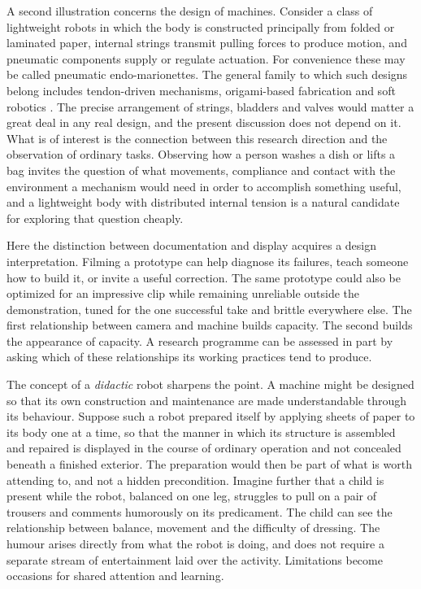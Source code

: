 \documentclass[11pt]{article}
\theoremstyle{definition}
\theoremstyle{remark}
\begin{document}
A second illustration concerns the design of machines. Consider a class of lightweight robots in which the body is constructed principally from folded or laminated paper, internal strings transmit pulling forces to produce motion, and pneumatic components supply or regulate actuation. For convenience these may be called pneumatic endo-marionettes. The general family to which such designs belong includes tendon-driven mechanisms, origami-based fabrication and soft robotics \cite{felton2014,rus2015}. The precise arrangement of strings, bladders and valves would matter a great deal in any real design, and the present discussion does not depend on it. What is of interest is the connection between this research direction and the observation of ordinary tasks. Observing how a person washes a dish or lifts a bag invites the question of what movements, compliance and contact with the environment a mechanism would need in order to accomplish something useful, and a lightweight body with distributed internal tension is a natural candidate for exploring that question cheaply.

Here the distinction between documentation and display acquires a design interpretation. Filming a prototype can help diagnose its failures, teach someone how to build it, or invite a useful correction. The same prototype could also be optimized for an impressive clip while remaining unreliable outside the demonstration, tuned for the one successful take and brittle everywhere else. The first relationship between camera and machine builds capacity. The second builds the appearance of capacity. A research programme can be assessed in part by asking which of these relationships its working practices tend to produce.

The concept of a \emph{didactic} robot sharpens the point. A machine might be designed so that its own construction and maintenance are made understandable through its behaviour. Suppose such a robot prepared itself by applying sheets of paper to its body one at a time, so that the manner in which its structure is assembled and repaired is displayed in the course of ordinary operation and not concealed beneath a finished exterior. The preparation would then be part of what is worth attending to, and not a hidden precondition. Imagine further that a child is present while the robot, balanced on one leg, struggles to pull on a pair of trousers and comments humorously on its predicament. The child can see the relationship between balance, movement and the difficulty of dressing. The humour arises directly from what the robot is doing, and does not require a separate stream of entertainment laid over the activity. Limitations become occasions for shared attention and learning.
\end{document}
